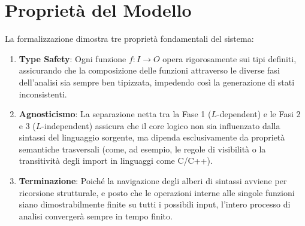 \section{Proprietà del Modello}
La formalizzazione dimostra tre proprietà fondamentali del sistema:
\begin{enumerate}
  \item \textbf{Type Safety}: Ogni funzione $f: I \to O$ opera
    rigorosamente sui tipi definiti, assicurando che la composizione
    delle funzioni attraverso le diverse fasi dell'analisi sia sempre
    ben tipizzata, impedendo così la generazione di stati inconsistenti.
  \item \textbf{Agnosticismo}: La separazione netta tra la Fase 1
    ($L$-dependent) e le Fasi 2 e 3 ($L$-independent) assicura che il
    core logico non sia influenzato dalla sintassi del linguaggio
    sorgente, ma dipenda esclusivamente da proprietà semantiche
    trasversali (come, ad esempio, le regole di visibilità o la
    transitività degli import in linguaggi come C/C++).
  \item \textbf{Terminazione}: Poiché la navigazione degli alberi di
    sintassi avviene per ricorsione strutturale, e posto che le
    operazioni interne alle singole funzioni siano dimostrabilmente
    finite su tutti i possibili input, l'intero processo di analisi
    convergerà sempre in tempo finito.
\end{enumerate}
